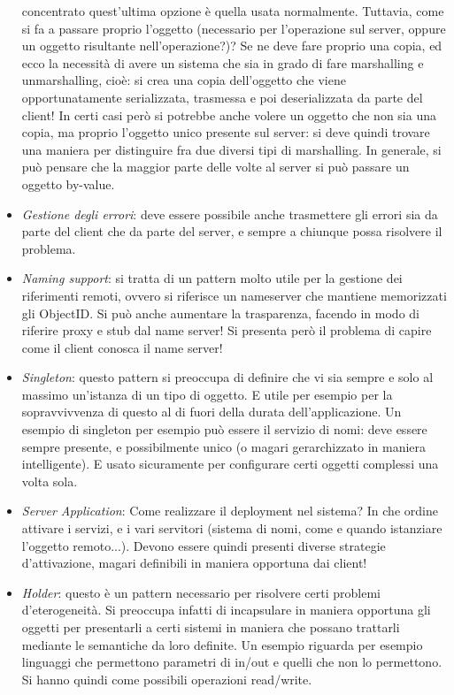 \begin{itemize}
 concentrato quest'ultima opzione è quella usata normalmente. Tuttavia, come si fa a passare proprio l'oggetto
 (necessario per l'operazione sul server, oppure un oggetto risultante nell'operazione?)? Se ne deve fare proprio una
 copia, ed ecco la necessità di avere un sistema che sia in grado di fare marshalling e unmarshalling, cioè: si crea
 una copia dell'oggetto che viene opportunatamente serializzata, trasmessa e poi deserializzata da parte del client!
 In certi casi però si potrebbe anche volere un oggetto che non sia una copia, ma proprio l'oggetto unico presente
 sul server: si deve quindi trovare una maniera per distinguire fra due diversi tipi di marshalling. In generale, si
 può pensare che la maggior parte delle volte al server si può passare un oggetto by-value.
 \item \textit{Gestione degli errori}: deve essere possibile anche trasmettere gli errori sia da parte del client che
 da parte del server, e sempre a chiunque possa risolvere il problema.
 \item \textit{Naming support}: si tratta di un pattern molto utile per la gestione dei riferimenti remoti, ovvero si
 riferisce un nameserver che mantiene memorizzati gli ObjectID. Si può anche aumentare la trasparenza, facendo in
 modo di riferire proxy e stub dal name server! Si presenta però il problema di capire come il client conosca il name
 server!
 \item \textit{Singleton}: questo pattern si preoccupa di definire che vi sia sempre e solo al massimo un'istanza di
 un tipo di oggetto. E utile per esempio per la sopravvivvenza di questo al di fuori della durata dell'applicazione.
 Un esempio di singleton per esempio può essere il servizio di nomi: deve essere sempre presente, e possibilmente unico
 (o magari gerarchizzato in maniera intelligente). E usato sicuramente per configurare certi oggetti complessi una
 volta sola.
 \item \textit{Server Application}: Come realizzare il deployment nel sistema? In che ordine attivare i servizi, e i
 vari servitori (sistema di nomi, come e quando istanziare l'oggetto remoto...). Devono essere quindi presenti
 diverse strategie d'attivazione, magari definibili in maniera opportuna dai client!
 \item \textit{Holder}: questo è un pattern necessario per risolvere certi problemi d'eterogeneità. Si preoccupa
 infatti di incapsulare in maniera opportuna gli oggetti per presentarli a certi sistemi in maniera che possano
 trattarli mediante le semantiche da loro definite. Un esempio riguarda per esempio linguaggi che permettono parametri
 di in/out e quelli che non lo permettono. Si hanno quindi come possibili operazioni read/write.
\end{itemize}
